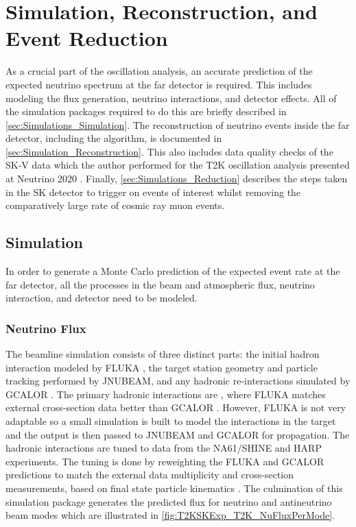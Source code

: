 \chapter{Simulation, Reconstruction, and Event Reduction}
\label{chap:Simulations}

As a crucial part of the oscillation analysis, an accurate prediction of the expected neutrino spectrum at the far detector is required. This includes modeling the flux generation, neutrino interactions, and detector effects. All of the simulation packages required to do this are briefly described in \autoref{sec:Simulations_Simulation}. The reconstruction of neutrino events inside the far detector, including the \fq algorithm, is documented in \autoref{sec:Simulation_Reconstruction}. This also includes data quality checks of the SK-V data which the author performed for the T2K oscillation analysis presented at Neutrino 2020 \cite{Dunne2020-uf}. Finally, \autoref{sec:Simulations_Reduction} describes the steps taken in the SK detector to trigger on events of interest whilst removing the comparatively large rate of cosmic ray muon events.

\section{Simulation}
\label{sec:Simulations_Simulation}

In order to generate a Monte Carlo prediction of the expected event rate at the far detector, all the processes in the beam and atmospheric flux, neutrino interaction, and detector need to be modeled. %

\subsection{Neutrino Flux}

The beamline simulation consists of three distinct parts: the initial hadron interaction modeled by FLUKA \cite{fluka2011}, the target station geometry and particle tracking performed by JNUBEAM, \cite{geant3, PhysRevD.87.012001} and any hadronic re-interactions simulated by GCALOR \cite{gcalor}. The primary hadronic interactions are , where FLUKA matches external cross-section data better than GCALOR \cite{t2k_tn_flux}. However, FLUKA is not very adaptable so a small simulation is built to model the interactions in the target and the output is then passed to JNUBEAM and GCALOR for propagation. The hadronic interactions are tuned to data from the NA61/SHINE \cite{Abgrall_2011, Abgrall_2012, NA61_pions_rep} and HARP \cite{harp} experiments. The tuning is done by reweighting the FLUKA and GCALOR predictions to match the external data multiplicity and cross-section measurements, based on final state particle kinematics \cite{t2k_tn_flux}. The culmination of this simulation package generates the predicted flux for neutrino and antineutrino beam modes which are illustrated in \autoref{fig:T2KSKExp_T2K_NuFluxPerMode}.

